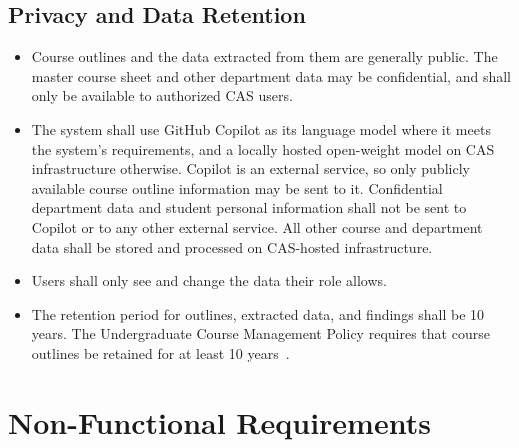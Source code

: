 \documentclass[12pt]{article}
\newcounter{drnum} %
\begin{document}
\subsection{Privacy and Data Retention} \label{SecPrivacyDataRetention}

\begin{itemize}

\item[DR\refstepcounter{drnum}\thedrnum \label{DR_Confidentiality}:] Course outlines and the data extracted from them are generally public. The master course sheet and other department data may be confidential, and shall only be available to authorized CAS users.

\item[DR\refstepcounter{drnum}\thedrnum \label{DR_Hosting}:] The system shall use GitHub Copilot as its language model where it meets the system's requirements, and a locally hosted open-weight model on CAS infrastructure otherwise. Copilot is an external service, so only publicly available course outline information may be sent to it. Confidential department data and student personal information shall not be sent to Copilot or to any other external service. All other course and department data shall be stored and processed on CAS-hosted infrastructure.

\item[DR\refstepcounter{drnum}\thedrnum \label{DR_Access}:] Users shall only see and change the data their role allows.

\item[DR\refstepcounter{drnum}\thedrnum \label{DR_Retention}:] The retention period for outlines, extracted data, and findings shall be 10 years. The Undergraduate Course Management Policy requires that course outlines be retained for at least 10 years~\citep{McMasterUCMP2025}.

\end{itemize}

\section{Non-Functional Requirements} \label{sec_NFRs}
\end{document}

